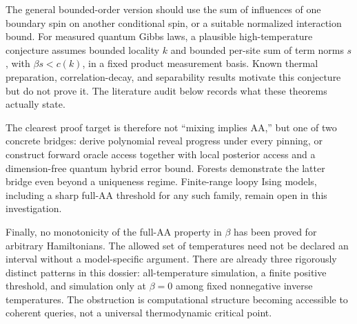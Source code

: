 The general bounded-order version should use the sum of influences of
one boundary spin on another conditional spin, or a suitable normalized
interaction bound. For measured quantum Gibbs laws, a plausible
high-temperature conjecture assumes bounded locality $k$ and bounded
per-site sum of term norms $s$, with $\beta s<c(k)$, in a fixed product
measurement basis. Known thermal preparation, correlation-decay, and
separability results motivate this conjecture but do not prove it.
The literature audit below records what these theorems actually state.

The clearest proof target is therefore not ``mixing implies AA,'' but
one of two concrete bridges: derive polynomial reveal progress under
every pinning, or construct forward oracle access together with local
posterior access and a dimension-free quantum hybrid error bound.
Forests demonstrate the latter bridge even beyond a uniqueness regime.
Finite-range loopy Ising models, including a sharp full-AA threshold
for any such family, remain open in this investigation.

Finally, no monotonicity of the full-AA property in $\beta$ has been
proved for arbitrary Hamiltonians. The allowed set of temperatures need
not be declared an interval without a model-specific argument. There
are already three rigorously distinct patterns in this dossier:
all-temperature simulation, a finite positive threshold, and simulation
only at $\beta=0$ among fixed nonnegative inverse temperatures. The
obstruction is computational structure becoming accessible to coherent
queries, not a universal thermodynamic critical point.
